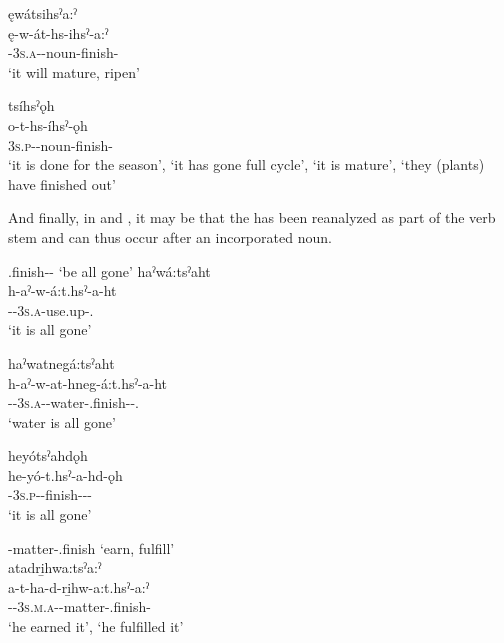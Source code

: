 \ex ęwátsihsˀa:ˀ\\
\gll ę-w-át-hs-ihsˀ-a:ˀ\\
 \fut-\textsc{3s.a}-{\semireflexive}-noun-finish-{\punctual}\\
\glt `it will mature, ripen'

\ex tsíhsˀǫh \\
\gll o-t-hs-íhsˀ-ǫh\\
 \textsc{3s.p}-{\semireflexive}-noun-finish-{\stative}\\
\glt ‘it is done for the season’, ‘it has gone full cycle’, ‘it is mature’, `they (plants) have finished out'
\z
\z

And finally, in  and , it may be that the  {\semireflexive} has been reanalyzed as part of the verb stem and can thus occur after an incorporated noun.
 


\ea\label{ex:eventuative2}  {\semireflexive}.finish-{\joinerA}- ‘be all gone’
\ea haˀwá:tsˀaht\\
\gll h-aˀ-w-á:t.hsˀ-a-ht\\
 {\translocative}-{\factual}-\textsc{3s.a}-use.up-{\causative}.{\zeropunctual}\\
\glt `it is all gone'

\ex haˀwatnegá:tsˀaht\\
\gll h-aˀ-w-at-hneg-á:t.hsˀ-a-ht\\
 {\translocative}-{\factual}-\textsc{3s.a}-{\semireflexive}-water-{\semireflexive}.finish-{\joinerA}-{\causative}.{\zeropunctual}\\
\glt `water is all gone'

\ex heyótsˀahdǫh\\
\gll he-yó-t.hsˀ-a-hd-ǫh\\
 {\translocative}-\textsc{3s.p}-{\semireflexive}-finish-{\joinerA}-{\causative}-{\stative}\\
\glt `it is all gone'
\z
\z

\ea\label{ex:eventuative9}  -matter-{\semireflexive}.finish ‘earn, fulfill’\\
atadri̱hwa:tsˀa:ˀ \\
\gll a-t-ha-d-ri̱hw-a:t.hsˀ-a:ˀ\\
{\factual}-{\cislocative}-\textsc{3s.m.a}-{\semireflexive}-matter-{\semireflexive}.finish-{\punctual}\\
\glt ‘he earned it’, ‘he fulfilled it’ 
\z

